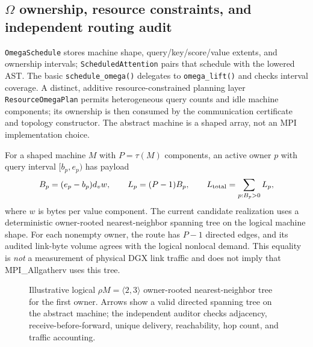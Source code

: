 \documentclass[11pt]{article}
\begin{document}
\subsection{$\Omega$ ownership, resource constraints, and independent routing audit}
\texttt{OmegaSchedule} stores machine shape, query/key/score/value extents,
and ownership intervals; \texttt{ScheduledAttention} pairs that schedule
with the lowered AST. The basic \texttt{schedule\_omega()} delegates to
\texttt{omega\_lift()} and checks interval coverage. A distinct, additive
resource-constrained planning layer \texttt{ResourceOmegaPlan} permits
heterogeneous query counts and idle machine components; its ownership is
then consumed by the communication certificate and topology constructor.
The abstract machine is a shaped array, not an MPI implementation choice.

For a shaped machine $M$ with $P=\tau(M)$ components, an active owner $p$
with query interval $[b_p,e_p)$ has payload
\begin{equation}
 B_p=(e_p-b_p)d_v w,
 \qquad L_p=(P-1)B_p,
 \qquad L_{\rm total}=\sum_{p:B_p>0}L_p,
\label{eq:nov-linkbytes}
\end{equation}
where $w$ is bytes per value component. The current candidate realization
uses a deterministic owner-rooted nearest-neighbor spanning tree on the
logical machine shape. For each nonempty owner, the route has $P-1$ directed
edges, and its audited link-byte volume agrees with the logical nonlocal
demand. This equality is \emph{not} a measurement of physical DGX link
traffic and does not imply that MPI\_Allgatherv uses this tree.

\begin{figure}[htbp]\centering
{}
\caption{Illustrative logical $\rho M=\langle2,3\rangle$ owner-rooted
nearest-neighbor tree for the first owner. Arrows show a valid directed
spanning tree on the abstract machine; the independent auditor checks
adjacency, receive-before-forward, unique delivery, reachability, hop count,
and traffic accounting.}
\label{fig:nov-tree}
\end{figure}
\end{document}
